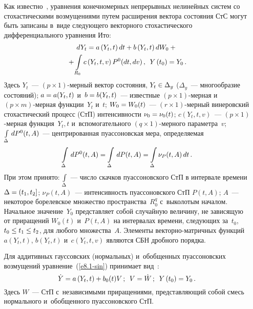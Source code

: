 \begin{multicols}{2}
Как известно~\cite{1-sin, 5-sin, 6-sin},  уравнения конечномерных непрерывных 
нелинейных систем со стохастическими возмущениями путем расширения вектора 
состояния СтС могут быть записаны в~виде сле\-ду\-юще\-го векторного стохастического 
дифференциального уравнения Ито:
    \begin{multline}
    dY_t = \displaystyle a\left(Y_t, t\right) dt + b \left(Y_t, t\right) dW_0+ {}\\
{}+\displaystyle \int\limits_{R_0} c 
    \left(Y_t, t, v\right) P^0 (dt, dv)\,,\enskip
    Y\left(t_0\right) = Y_0\,.
    \label{e8.1-sin}
    \end{multline}
Здесь $Y_t$~--- $(p\times 1)$-мер\-ный вектор состояния, 
$Y_t \hm\in \Delta_y$ ($\Delta_y$~--- многообразие состояний);  
$a\hm=a(Y_t, t)$ и~$b\hm=b(Y_t, t)$~--- известные  $(p\times 1)$-мер\-ная 
и~ $(p\times m)$-мер\-ная функции~$Y_t$ и~$t$;  $W_0\hm= W_0(t)$~--- 
$(r\times 1)$-мер\-ный винеровский стохастический процесс (СтП) интенсивности  
$\nu_0 \hm= \nu_0(t)$; $c(Y_t, t, v)$~--- $(p\times 1)$-мер\-ная функция~$Y_t, t$ 
и~вспомогательного $(q\times 1)$-мер\-но\-го параметра~$v$; 
$\int\limits_{\Delta}\, dP^0 (t, A)$~--- центрированная пуассоновская мера, определяемая
    $$
    \int\limits_{\Delta} \,dP^0 (t, A) = \int\limits_{\Delta} \,dP (t,A) =\int\limits_{\Delta} 
    \nu_P (t,A) \,dt\,.$$
При этом принято: $\int\limits_{\Delta}$~--- число скачков пуассоновского СтП
в интервале времени  $\Delta \hm= (t_1, t_2]$; $\nu_P (t, A)$~---
интенсивность пуассоновского СтП  $P(t,A)$; $A$~--- некоторое
борелевское множество пространства~$R_0^q$ с~выколотым началом.
Начальное значение~$Y_0$ представляет собой случайную величину, не зависящую 
от приращений $W_0(t)$ и~$P(t,A)$ на
интервалах времени, следующих за~$t_0$, $t_0 \hm\le t_1\hm\le t_2$, для
любого множества~$A$. Элементы век\-тор\-но-мат\-рич\-ных функций $a(Y_t,t)$, 
$b(Y_t,t)$ и~$c(Y_t,t,v)$ являются СБН дробного порядка.


Для аддитивных гауссовских (нормальных) и~обобщенных 
пуассоновских возмущений уравнение~(\ref{e8.1-sin}) принимает  вид~\cite{1-sin, 5-sin, 6-sin}:
\begin{equation}
\dot Y = a\left(Y_t,t\right)+ b_0 (t) V\,; \enskip 
    V = \dot W\,;\enskip 
    Y\left(t_0\right) = Y_0\,.
    \label{e8.2-sin}
    \end{equation}
Здесь $W$~--- СтП с~независимыми приращениями, представляющий собой смесь 
нормального и~обобщенного пуассоновского СтП.



\end{multicols}
